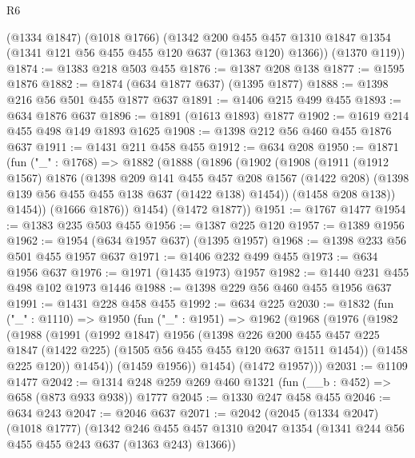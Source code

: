 \begin{lexlean}{R6}
\begin{coremodule}
      (@1334 @1847)
      (@1018 @1766)
      (@1342
        @200
        @455
        @457
        @1310
        @1847
        @1354
        (@1341 @121 @56 @455 @455 @120 @637 (@1363 @120) @1366))
      (@1370 @119))
@1874 := @1383 @218 @503 @455
@1876 := @1387 @208 @138
@1877 := @1595 @1876
@1882 := @1874 (@634 @1877 @637) (@1395 @1877)
@1888 := @1398 @216 @56 @501 @455 @1877 @637
@1891 := @1406 @215 @499 @455
@1893 := @634 @1876 @637
@1896 := @1891 (@1613 @1893) @1877
@1902 := @1619 @214 @455 @498 @149 @1893 @1625
@1908 := @1398 @212 @56 @460 @455 @1876 @637
@1911 := @1431 @211 @458 @455
@1912 := @634 @208
@1950 := @1871
    (fun ("_" : @1768) =>
    @1882
      (@1888
        (@1896
          (@1902
            (@1908
              (@1911
                (@1912 @1567)
                @1876
                (@1398
                  @209
                  @141
                  @455
                  @457
                  @208
                  @1567
                  (@1422 @208)
                  (@1398 @139 @56 @455 @455 @138 @637 (@1422 @138) @1454))
                (@1458 @208 @138))
              @1454))
          (@1666 @1876))
        @1454)
      (@1472 @1877))
@1951 := @1767 @1477
@1954 := @1383 @235 @503 @455
@1956 := @1387 @225 @120
@1957 := @1389 @1956
@1962 := @1954 (@634 @1957 @637) (@1395 @1957)
@1968 := @1398 @233 @56 @501 @455 @1957 @637
@1971 := @1406 @232 @499 @455
@1973 := @634 @1956 @637
@1976 := @1971 (@1435 @1973) @1957
@1982 := @1440 @231 @455 @498 @102 @1973 @1446
@1988 := @1398 @229 @56 @460 @455 @1956 @637
@1991 := @1431 @228 @458 @455
@1992 := @634 @225
@2030 := @1832
    (fun ("_" : @1110) =>
    @1950
      (fun ("_" : @1951) =>
      @1962
        (@1968
          (@1976
            (@1982
              (@1988
                (@1991
                  (@1992 @1847)
                  @1956
                  (@1398
                    @226
                    @200
                    @455
                    @457
                    @225
                    @1847
                    (@1422 @225)
                    (@1505 @56 @455 @455 @120 @637 @1511 @1454))
                  (@1458 @225 @120))
                @1454))
            (@1459 @1956))
          @1454)
        (@1472 @1957)))
@2031 := @1109 @1477
@2042 := @1314 @248 @259 @269 @460 @1321 (fun (__b : @452) => @658 (@873 @933 @938)) @1777
@2045 := @1330 @247 @458 @455
@2046 := @634 @243
@2047 := @2046 @637
@2071 := @2042
    (@2045
      (@1334 @2047)
      (@1018 @1777)
      (@1342
        @246
        @455
        @457
        @1310
        @2047
        @1354
        (@1341 @244 @56 @455 @455 @243 @637 (@1363 @243) @1366))

\end{coremodule}
\end{lexlean}
